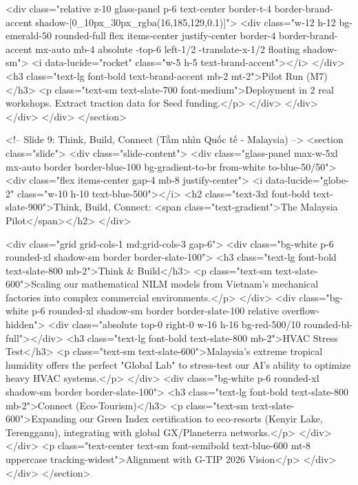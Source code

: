                         <div class="relative z-10 glass-panel p-6 text-center border-t-4 border-brand-accent shadow-[0_10px_30px_rgba(16,185,129,0.1)]">
                            <div class="w-12 h-12 bg-emerald-50 rounded-full flex items-center justify-center border-4 border-brand-accent mx-auto mb-4 absolute -top-6 left-1/2 -translate-x-1/2 floating shadow-sm">
                                <i data-lucide="rocket" class="w-5 h-5 text-brand-accent"></i>
                            </div>
                            <h3 class="text-lg font-bold text-brand-accent mb-2 mt-2">Pilot Run (M7)</h3>
                            <p class="text-sm text-slate-700 font-medium">Deployment in 2 real workshops. Extract traction data for Seed funding.</p>
                        </div>
                    </div>
                </div>
            </div>
        </section>

        <!-- Slide 9: Think, Build, Connect (Tầm nhìn Quốc tế - Malaysia) -->
        <section class="slide">
            <div class="slide-content">
                <div class="glass-panel max-w-5xl mx-auto border border-blue-100 bg-gradient-to-br from-white to-blue-50/50">
                    <div class="flex items-center gap-4 mb-8 justify-center">
                        <i data-lucide="globe-2" class="w-10 h-10 text-blue-500"></i>
                        <h2 class="text-3xl font-bold text-slate-900">Think, Build, Connect: <span class="text-gradient">The Malaysia Pilot</span></h2>
                    </div>
                    
                    <div class="grid grid-cols-1 md:grid-cols-3 gap-6">
                        <div class="bg-white p-6 rounded-xl shadow-sm border border-slate-100">
                            <h3 class="text-lg font-bold text-slate-800 mb-2">Think & Build</h3>
                            <p class="text-sm text-slate-600">Scaling our mathematical NILM models from Vietnam's mechanical factories into complex commercial environments.</p>
                        </div>
                        <div class="bg-white p-6 rounded-xl shadow-sm border border-slate-100 relative overflow-hidden">
                            <div class="absolute top-0 right-0 w-16 h-16 bg-red-500/10 rounded-bl-full"></div>
                            <h3 class="text-lg font-bold text-slate-800 mb-2">HVAC Stress Test</h3>
                            <p class="text-sm text-slate-600">Malaysia's extreme tropical humidity offers the perfect "Global Lab" to stress-test our AI's ability to optimize heavy HVAC systems.</p>
                        </div>
                        <div class="bg-white p-6 rounded-xl shadow-sm border border-slate-100">
                            <h3 class="text-lg font-bold text-slate-800 mb-2">Connect (Eco-Tourism)</h3>
                            <p class="text-sm text-slate-600">Expanding our Green Index certification to eco-resorts (Kenyir Lake, Terengganu), integrating with global GX/Planeterra networks.</p>
                        </div>
                    </div>
                    <p class="text-center text-sm font-semibold text-blue-600 mt-8 uppercase tracking-widest">Alignment with G-TIP 2026 Vision</p>
                </div>
            </div>
        </section>

